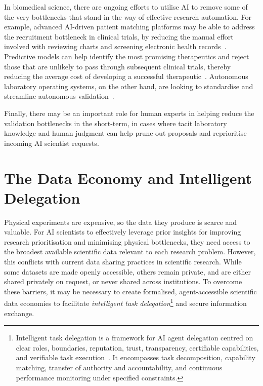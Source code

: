 \documentclass[11pt, a4paper, twocolumn, goog]{google}
\begin{document}
In biomedical science, there are ongoing efforts to utilise AI to remove some of the very bottlenecks that stand in the way of effective research automation. For example, advanced AI-driven patient matching platforms may be able to address the recruitment bottleneck in clinical trials, by reducing the manual effort involved with reviewing charts and screening electronic health records~\citep{askin2023artificial, gong2026clinical, chen2025trialbench}. Predictive models can help identify the most promising therapeutics and reject those that are unlikely to pass through subsequent clinical trials, thereby reducing the average cost of developing a successful therapeutic~\citep{harrer2019artificial, aliper2023prediction}. Autonomous laboratory operating systems, on the other hand, are looking to standardise and streamline autonomous validation~\citep{reder2023genesis, gao2025unilabos}.

Finally, there may be an important role for human experts in helping reduce the validation bottlenecks in the short-term, in cases where tacit laboratory knowledge and human judgment can help prune out proposals and reprioritise incoming AI scientist requests.

\section{The Data Economy and Intelligent Delegation}
\label{sec:economy}

Physical experiments are expensive, so the data they produce is scarce and valuable. For AI scientists to effectively leverage prior insights for improving research prioritisation and minimising physical bottlenecks, they need access to the broadest available scientific data relevant to each research problem. However, this conflicts with current data sharing practices in scientific research. While some datasets are made openly accessible, others remain private, and are either shared privately on request, or never shared across institutions. To overcome these barriers, it may be necessary to create formalised, agent-accessible scientific data economies to facilitate \emph{intelligent task delegation}\footnote{Intelligent task delegation is a framework for AI agent delegation centred on clear roles, boundaries, reputation, trust, transparency, certifiable capabilities,  and verifiable task execution~\citep{tomasev2026intelligentaidelegation}. It encompasses task decomposition, capability matching, transfer of authority and accountability, and continuous performance monitoring under specified constraints.} and secure information exchange. 
\end{document}
